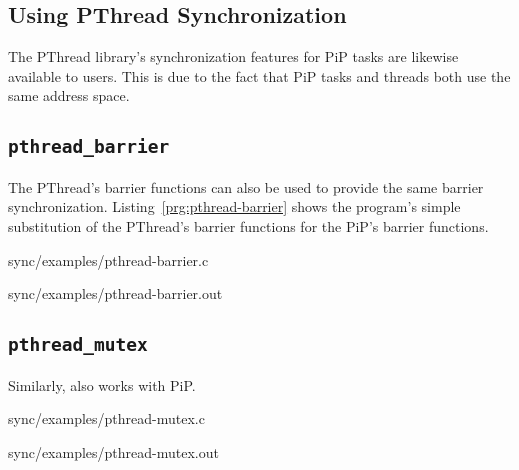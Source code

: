\subsection{Using PThread Synchronization}

The PThread library's synchronization features for PiP tasks are
likewise available to users. This is due to the fact that PiP tasks
and threads both use the same address space. 

\subsection{\tt pthread_barrier}

The PThread's barrier functions can also be used to provide the same
barrier synchronization. Listing~\ref{prg:pthread-barrier} shows the
program's simple substitution of the PThread's barrier functions for the
PiP's barrier functions.


                {sync/examples/pthread-barrier.c}


                {sync/examples/pthread-barrier.out}
                
\subsection{\tt pthread_mutex}

Similarly,  also works with PiP. 


                {sync/examples/pthread-mutex.c}


                {sync/examples/pthread-mutex.out}
